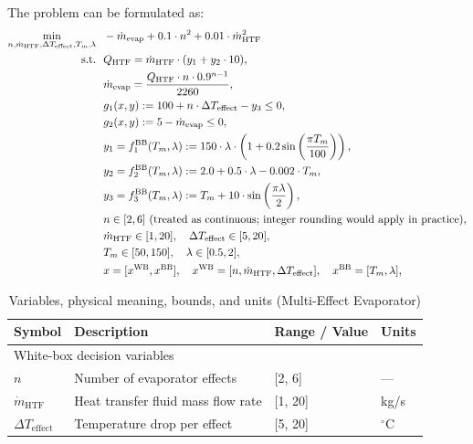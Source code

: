 \documentclass[12pt,a4paper]{article}%
\theoremstyle{plain}%
\theoremstyle{remark}%
\theoremstyle{definition}%
\def\WB{\mathrm{WB}}
\def\BB{\mathrm{BB}}
\begin{document}
\begin{appendices}
The problem can be formulated as:
\begin{align} \label{eq:Evaporator}
    \min_{n, \dot{m}_{\text{HTF}}, \Delta T_{\text{effect}}, T_m, \lambda} &~~ -\dot{m}_{\text{evap}} + 0.1 \cdot n^2 + 0.01 \cdot \dot{m}_{\text{HTF}}^2 \\\notag
    \text{s.t.} &~~ Q_{\text{HTF}} = \dot{m}_{\text{HTF}} \cdot (y_1 + y_2 \cdot 10), \\\notag
    &~~ \dot{m}_{\text{evap}} = \frac{Q_{\text{HTF}} \cdot n \cdot 0.9^{n-1}}{2260}, \\\notag
    &~~ g_1(x, y) := 100 + n \cdot \Delta T_{\text{effect}} - y_3 \leq 0, \\\notag
    &~~ g_2(x, y) := 5 - \dot{m}_{\text{evap}} \leq 0, \\\notag
    &~~ y_1 = f^\BB_1(T_m, \lambda) := 150 \cdot \lambda \cdot \left(1 + 0.2 \sin\left(\frac{\pi T_m}{100}\right)\right), \\\notag
    &~~ y_2 = f^\BB_2(T_m, \lambda) := 2.0 + 0.5 \cdot \lambda - 0.002 \cdot T_m, \\\notag
    &~~ y_3 = f^\BB_3(T_m, \lambda) := T_m + 10 \cdot \sin\left(\frac{\pi \lambda}{2}\right), \\\notag
    &~~ n \in [2, 6] \text{ (treated as continuous; integer rounding would apply in practice)}, \\\notag
    &~~ \dot{m}_{\text{HTF}} \in [1, 20], \quad \Delta T_{\text{effect}} \in [5, 20], \\\notag
    &~~ T_m \in [50, 150], \quad \lambda \in [0.5, 2], \\\notag
    &~~ x = [x^{\WB}, x^{\BB}], \quad x^{\WB} = [n, \dot{m}_{\text{HTF}}, \Delta T_{\text{effect}}], \quad x^{\BB} = [T_m, \lambda],
\end{align}
\begin{table}[htbp]
\centering
\caption{Variables, physical meaning, bounds, and units (Multi-Effect Evaporator)}
\label{tab:evaporator_vars}
\begin{tabular}{@{}llll@{}}
\toprule
\textbf{Symbol} & \textbf{Description} & \textbf{Range / Value} & \textbf{Units} \\
\midrule
\multicolumn{4}{l}{White-box decision variables} \\
\midrule
$n$ & Number of evaporator effects & [2, 6] & --- \\
$\dot{m}_{\text{HTF}}$ & Heat transfer fluid mass flow rate & [1, 20] & kg/s \\
$\Delta T_{\text{effect}}$ & Temperature drop per effect & [5, 20] & $^\circ$C \\

\end{tabular}
\end{table}
\end{appendices}
\end{document}
